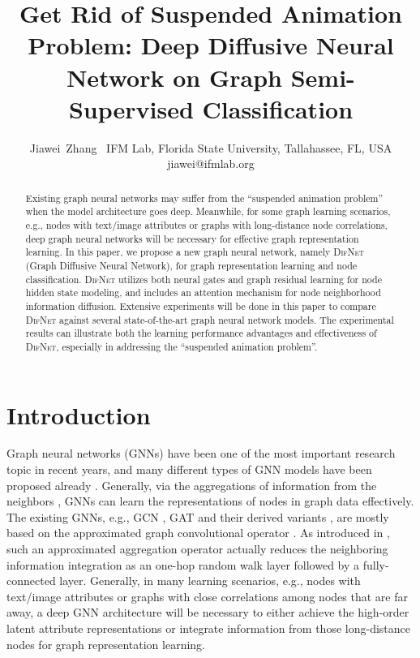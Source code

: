 \documentclass{article}
\title{Get Rid of Suspended Animation Problem: Deep Diffusive Neural Network on Graph Semi-Supervised Classification}
\author{Jiawei~Zhang\
\affiliations
IFM Lab, Florida State University, Tallahassee, FL, USA\\
 \emails
  jiawei@ifmlab.org}
\newcommand{\our}{\textsc{DifNet}}
\newcommand{\gcn}{\textsc{GCN}}
\newcommand{\gat}{\textsc{GAT}}
\begin{document}
\maketitle

\begin{abstract}

Existing graph neural networks may suffer from the ``suspended animation problem'' when the model architecture goes deep. Meanwhile, for some graph learning scenarios, e.g., nodes with text/image attributes or graphs with long-distance node correlations, deep graph neural networks will be necessary for effective graph representation learning. In this paper, we propose a new graph neural network, namely {\our} (Graph Diffusive Neural Network), for graph representation learning and node classification. {\our} utilizes both neural gates and graph residual learning for node hidden state modeling, and includes an attention mechanism for node neighborhood information diffusion. Extensive experiments will be done in this paper to compare {\our} against several state-of-the-art graph neural network models. The experimental results can illustrate both the learning performance advantages and effectiveness of {\our}, especially in addressing the ``suspended animation problem''.

\end{abstract}
\section{Introduction}\label{sec:introduction}

Graph neural networks (GNNs) \cite{Wu_A_19,Zhang_Graph_19} have been one of the most important research topic in recent years, and many different types of GNN models have been proposed already \cite{Kipf_Semi_CORR_16}. Generally, via the aggregations of information from the neighbors \cite{Hammond_Wavelets_11,Defferrard_Convolutional_16}, GNNs can learn the representations of nodes in graph data effectively. The existing GNNs, e.g., {\gcn} \cite{Kipf_Semi_CORR_16}, {\gat} \cite{Velickovic_Graph_ICLR_18} and their derived variants \cite{Klicpera_Personalized_18,Li_Combinatorial_18,Gao_GraphNAS_19}, are mostly based on the approximated graph convolutional operator \cite{Hammond_Wavelets_11,Defferrard_Convolutional_16}. As introduced in \cite{Zhang_GResNet_19}, such an approximated aggregation operator actually reduces the neighboring information integration as an one-hop random walk layer followed by a fully-connected layer. Generally, in many learning scenarios, e.g., nodes with text/image attributes or graphs with close correlations among nodes that are far away, a deep GNN architecture will be necessary to either achieve the high-order latent attribute representations or integrate information from those long-distance nodes for graph representation learning.
\end{document}
